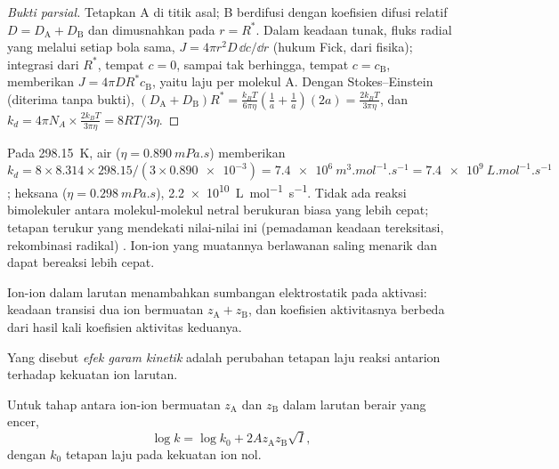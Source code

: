 \begin{proof}[Bukti parsial]
Tetapkan A di titik asal; B berdifusi dengan koefisien difusi relatif $D =
D_{\mathrm A} + D_{\mathrm B}$ dan dimusnahkan pada $r = R^*$. Dalam keadaan tunak, fluks
radial yang melalui setiap bola sama, $J = 4\pi r^2D\,\dd c/\dd r$ (hukum Fick,
dari fisika); integrasi dari $R^*$, tempat $c = 0$, sampai tak berhingga,
tempat $c = c_{\mathrm B}$, memberikan $J = 4\pi DR^*c_{\mathrm B}$, yaitu laju per molekul
A. Dengan Stokes--Einstein (diterima tanpa bukti),
$(D_{\mathrm A} + D_{\mathrm B})R^* = \frac{k_BT}{6\pi\eta}(\frac{1}{a} + \frac1a)(2a) = \frac{2k_BT}{3\pi\eta}$,
dan $k_d = 4\pi N_A \times
\frac{2k_BT}{3\pi\eta} = 8RT/3\eta$.
\end{proof}

\begin{example}\label{ex:b3:rate-theories:speed-limit}
Pada \qty{298.15}{K}, air ($\eta = \qty{0.890}{mPa.s}$) memberikan $k_d = 8 \times 8.314 \times
298.15/(3 \times \num{0.890e-3}) = \qty{7.4e6}{m^3.mol^{-1}.s^{-1}} = \qty{7.4e9}{L.mol^{-1}.s^{-1}}$;
heksana ($\eta = \qty{0.298}{mPa.s}$), \qty{2.2e10}{L.mol^{-1}.s^{-1}}. Tidak ada
reaksi bimolekuler antara molekul-molekul netral berukuran biasa yang lebih
cepat; tetapan terukur yang mendekati nilai-nilai ini (pemadaman keadaan
tereksitasi, rekombinasi radikal) . Ion-ion yang muatannya
berlawanan saling menarik dan dapat bereaksi lebih cepat.
\end{example}

Ion-ion dalam larutan menambahkan sumbangan elektrostatik pada aktivasi:
keadaan transisi dua ion bermuatan $z_{\mathrm A} + z_{\mathrm B}$, dan koefisien
aktivitasnya berbeda dari hasil kali koefisien aktivitas keduanya.

\begin{definition}\label{def:b3:rate-theories:salt}
Yang disebut \emph{efek garam kinetik} adalah
perubahan tetapan laju reaksi antarion terhadap kekuatan ion larutan.
\end{definition}

\begin{proposition}\label{prop:b3:rate-theories:bronsted-bjerrum}
Untuk tahap antara ion-ion bermuatan $z_{\mathrm A}$ dan $z_{\mathrm B}$ dalam larutan
berair yang encer,
\[
  \log k = \log k_0 + 2Az_{\mathrm A}z_{\mathrm B}\sqrt I,
\]
dengan $k_0$ tetapan laju pada kekuatan ion nol.
\end{proposition}

